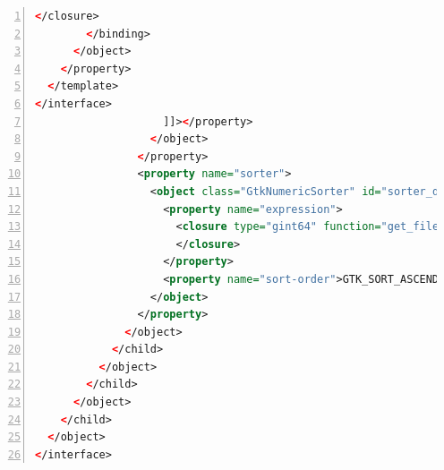 \begin{lstlisting}[language=XML, numbers=left]
          </closure>
        </binding>
      </object>
    </property>
  </template>
</interface>
                    ]]></property>
                  </object>
                </property>
                <property name="sorter">
                  <object class="GtkNumericSorter" id="sorter_datetime_modified">
                    <property name="expression">
                      <closure type="gint64" function="get_file_unixtime_modified">
                      </closure>
                    </property>
                    <property name="sort-order">GTK_SORT_ASCENDING</property>
                  </object>
                </property>
              </object>
            </child>
          </object>
        </child>
      </object>
    </child>
  </object>
</interface>
\end{lstlisting}

